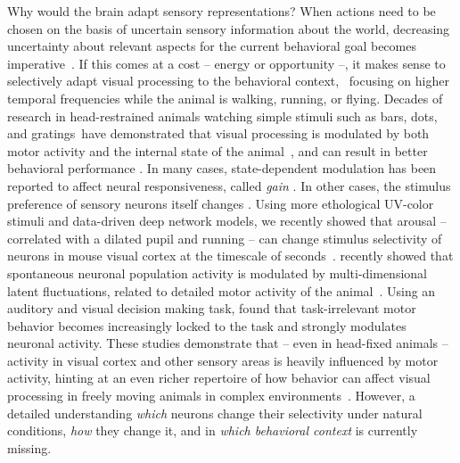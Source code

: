 \documentclass[COG,11pt]{ercgrant}
\begin{document}
Why would the brain adapt sensory representations? When actions need to be chosen on the basis of uncertain sensory information about the world, decreasing uncertainty about relevant aspects for the current behavioral goal becomes imperative~\parencite{Chebolu2022-tb}. 
If this comes at a cost -- energy or opportunity --, it makes sense to selectively adapt visual processing to the behavioral context, \eg~focusing on  higher temporal frequencies while the animal is walking, running, or flying.
Decades of research in head-restrained animals watching simple stimuli such as bars, dots, and gratings\ have demonstrated that visual processing is modulated by both motor activity and the internal state of the animal~\parencite{Rowell1971-zj, Wiersma1968-xt, Motter1993-od, Maimon2010-sa, Niell2010-bs,Bezdudnaya2006-ge, Treue1996-lp, Musall2019-kd, Busse2017-rt}, and can result in better behavioral performance \parencite{Spitzer1988-kq, Bennett2013-rk, Dadarlat2017-jw, De_Gee2022-ir}.
In many cases, state-dependent modulation has been reported to  affect neural responsiveness, called \textit{gain} \parencite{Eggermann2014-xp, Niell2010-bs, McAdams1999-cs,Schroder2020-jl, Dadarlat2017-jw, Mineault2016-fk}. 
In other cases, the stimulus preference of sensory neurons itself changes \parencite{Chiappe2010-bm, Bezdudnaya2006-ge, Andermann2011-vw, Treue1996-lp}. 
Using more ethological UV-color stimuli and data-driven deep network models, we recently showed that arousal -- correlated with a dilated pupil and running -- can change stimulus selectivity of neurons in mouse visual cortex at the timescale of seconds~\parencite{Franke2022-do}. 
\textcite{Stringer2019-lt} recently showed that spontaneous neuronal population activity is modulated by multi-dimensional latent fluctuations, related to detailed motor activity of the animal~\parencite{Syeda2022-bk}.
Using an auditory and visual decision making task, \textcite{Musall2019-kd} found that task-irrelevant motor behavior becomes increasingly locked to the task and strongly modulates neuronal activity.
These studies demonstrate that -- even in head-fixed animals -- activity in visual cortex and other sensory areas is heavily influenced by motor activity, hinting at an even richer repertoire of how behavior can affect visual processing in freely moving animals in complex environments~\parencite{Busse2017-rt,Huk2018-ez, Datta2019-qj}.
However, a detailed understanding \textit{which} neurons change their selectivity under natural conditions, \textit{how} they change it, and in \textit{which behavioral context} is currently missing.
\end{document}
